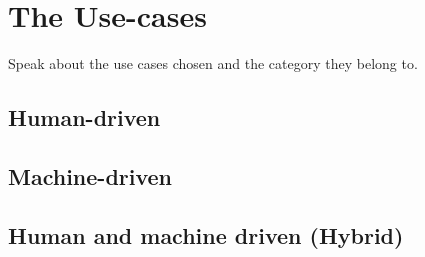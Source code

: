 
\chapter{The Use-cases}
\label{cap:cases}

Speak about the use cases chosen and the category they belong to.

% 



\section{Human-driven}
\label{sec:cases:human}


\section{Machine-driven}
\label{sec:cases:machine}


\section{Human and machine driven (Hybrid)}
\label{sec:cases:human-machine}
